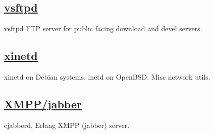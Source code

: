 \subsection{\href{http://vsftpd.beasts.org/}{vsftpd}}
vsftpd FTP server for public facing download and devel servers.

\subsection{\href{http://www.xinetd.org}{xinetd}}
xinetd on Debian systems. inetd on OpenBSD. Misc network utils.

\subsection{\href{http://www.ejabberd.im/}{XMPP/jabber}}
ejabberd, Erlang XMPP (jabber) server.

